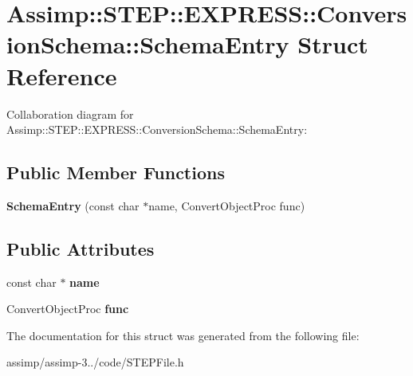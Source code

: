 \hypertarget{struct_assimp_1_1_s_t_e_p_1_1_e_x_p_r_e_s_s_1_1_conversion_schema_1_1_schema_entry}{\section{Assimp\+:\+:S\+T\+E\+P\+:\+:E\+X\+P\+R\+E\+S\+S\+:\+:Conversion\+Schema\+:\+:Schema\+Entry Struct Reference}
\label{struct_assimp_1_1_s_t_e_p_1_1_e_x_p_r_e_s_s_1_1_conversion_schema_1_1_schema_entry}
}


Collaboration diagram for Assimp\+:\+:S\+T\+E\+P\+:\+:E\+X\+P\+R\+E\+S\+S\+:\+:Conversion\+Schema\+:\+:Schema\+Entry\+:
\subsection*{Public Member Functions}
\begin{DoxyCompactItemize}
\item 
\hypertarget{struct_assimp_1_1_s_t_e_p_1_1_e_x_p_r_e_s_s_1_1_conversion_schema_1_1_schema_entry_aacf4994e788dc91417e1efb65dd5175d}{{\bfseries Schema\+Entry} (const char $\ast$name, Convert\+Object\+Proc func)}\label{struct_assimp_1_1_s_t_e_p_1_1_e_x_p_r_e_s_s_1_1_conversion_schema_1_1_schema_entry_aacf4994e788dc91417e1efb65dd5175d}

\end{DoxyCompactItemize}
\subsection*{Public Attributes}
\begin{DoxyCompactItemize}
\item 
\hypertarget{struct_assimp_1_1_s_t_e_p_1_1_e_x_p_r_e_s_s_1_1_conversion_schema_1_1_schema_entry_a810c9822b1d7329d27625b88b8215091}{const char $\ast$ {\bfseries name}}\label{struct_assimp_1_1_s_t_e_p_1_1_e_x_p_r_e_s_s_1_1_conversion_schema_1_1_schema_entry_a810c9822b1d7329d27625b88b8215091}

\item 
\hypertarget{struct_assimp_1_1_s_t_e_p_1_1_e_x_p_r_e_s_s_1_1_conversion_schema_1_1_schema_entry_a0a439a2b8eedcbbd03382802b31e810c}{Convert\+Object\+Proc {\bfseries func}}\label{struct_assimp_1_1_s_t_e_p_1_1_e_x_p_r_e_s_s_1_1_conversion_schema_1_1_schema_entry_a0a439a2b8eedcbbd03382802b31e810c}

\end{DoxyCompactItemize}


The documentation for this struct was generated from the following file\+:\begin{DoxyCompactItemize}
\item 
assimp/assimp-\/3../code/S\+T\+E\+P\+File.\+h\end{DoxyCompactItemize}
